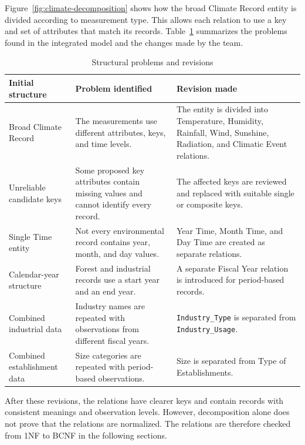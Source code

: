 Figure~\ref{fig:climate-decomposition} shows how the broad Climate Record
entity is divided according to measurement type. This allows each relation to
use a key and set of attributes that match its records.
Table~\ref{tab:structural-revisions} summarizes the problems found in the
integrated model and the changes made by the team.
\begin{table}[H]
\centering
\caption{Structural problems and revisions}
\label{tab:structural-revisions}

\small
\renewcommand{\arraystretch}{1.25}
\setlength{\tabcolsep}{6pt}

\begin{tabular}{@{}p{3.2cm}p{5.0cm}p{5.7cm}@{}}
\toprule

\textbf{Initial structure} &
\textbf{Problem identified} &
\textbf{Revision made} \\

\midrule

Broad Climate Record &
The measurements use different attributes, keys, and time levels. &
The entity is divided into Temperature, Humidity, Rainfall, Wind, Sunshine,
Radiation, and Climatic Event relations. \\

Unreliable candidate keys &
Some proposed key attributes contain missing values and cannot identify every
record. &
The affected keys are reviewed and replaced with suitable single or composite
keys. \\

Single Time entity &
Not every environmental record contains year, month, and day values. &
Year Time, Month Time, and Day Time are created as separate relations. \\

Calendar-year structure &
Forest and industrial records use a start year and an end year. &
A separate Fiscal Year relation is introduced for period-based records. \\

Combined industrial data &
Industry names are repeated with observations from different fiscal years. &
\texttt{Industry\_Type} is separated from \texttt{Industry\_Usage}. \\

Combined establishment data &
Size categories are repeated with period-based observations. &
Size is separated from Type of Establishments. \\

\bottomrule
\end{tabular}
\end{table}
After these revisions, the relations have clearer keys and contain records
with consistent meanings and observation levels. However, decomposition alone
does not prove that the relations are normalized. The relations are therefore
checked from 1NF to BCNF in the following sections.


